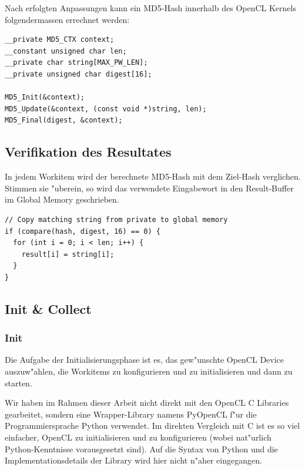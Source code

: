 \begin{refsection}
Nach erfolgten Anpassungen kann ein MD5-Hash innerhalb des OpenCL Kernels
folgendermassen errechnet werden:

\begin{small}
\begin{verbatim}
__private MD5_CTX context;
__constant unsigned char len;
__private char string[MAX_PW_LEN];
__private unsigned char digest[16];

MD5_Init(&context);
MD5_Update(&context, (const void *)string, len);
MD5_Final(digest, &context);
\end{verbatim}
\end{small}

\subsection{Verifikation des Resultates}
\label{crypto:verifikation}

In jedem Workitem wird der berechnete MD5-Hash mit dem Ziel-Hash verglichen.
Stimmen sie "uberein, so wird das verwendete Eingabewort in den Result-Buffer im
Global Memory geschrieben.

\begin{small}
\begin{verbatim}
// Copy matching string from private to global memory
if (compare(hash, digest, 16) == 0) {
  for (int i = 0; i < len; i++) {
    result[i] = string[i];
  }
}
\end{verbatim}
\end{small}

\subsection{Init \& Collect}

\subsubsection{Init}

Die Aufgabe der Initialisierungsphase ist es, das gew"unschte OpenCL Device
auszuw"ahlen, die Workitems zu konfigurieren und zu initialisieren und dann zu
starten.

Wir haben im Rahmen dieser Arbeit nicht direkt mit den OpenCL C Libraries
gearbeitet, sondern eine Wrapper-Library namens
PyOpenCL\cite{crypto:pyopencl_docs} f"ur die Programmiersprache
Python\cite{crypto:python} verwendet. Im direkten Vergleich mit C ist es so viel
einfacher, OpenCL zu initialisieren und zu konfigurieren (wobei nat"urlich
Python-Kenntnisse vorausgesetzt sind). Auf die Syntax von Python und die
Implementationsdetails der Library wird hier nicht n"aher eingegangen.


\end{refsection}
